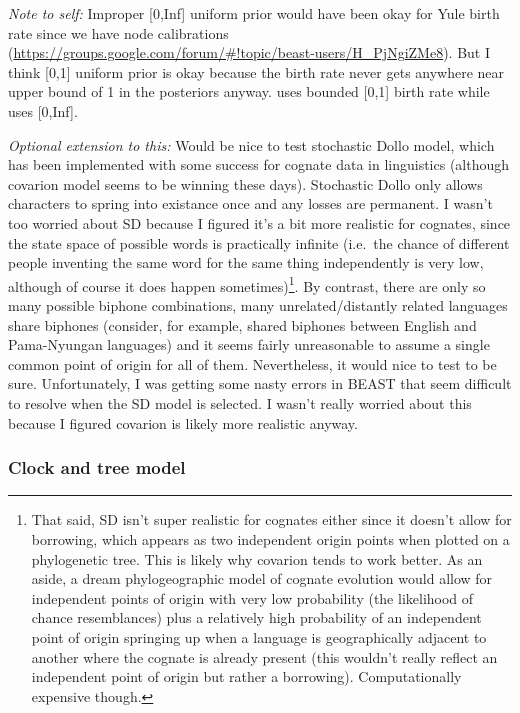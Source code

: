 \documentclass[]{article}
\begin{document}
\emph{Note to self:} Improper {[}0,Inf{]} uniform prior would have been okay for Yule birth rate since we have node calibrations (\url{https://groups.google.com/forum/\#!topic/beast-users/H_PjNgiZMe8}). But I think {[}0,1{]} uniform prior is okay because the birth rate never gets anywhere near upper bound of 1 in the posteriors anyway. \textcite{kolipakam_bayesian_2018} uses bounded {[}0,1{]} birth rate while \textcite{bouckaert_origin_2018} uses {[}0,Inf{]}.

\emph{Optional extension to this:} Would be nice to test stochastic Dollo model, which has been implemented with some success for cognate data in linguistics (although covarion model seems to be winning these days). Stochastic Dollo only allows characters to spring into existance once and any losses are permanent. I wasn't too worried about SD because I figured it's a bit more realistic for cognates, since the state space of possible words is practically infinite (i.e.~the chance of different people inventing the same word for the same thing independently is very low, although of course it does happen sometimes)\footnote{That said, SD isn't super realistic for cognates either since it doesn't allow for borrowing, which appears as two independent origin points when plotted on a phylogenetic tree. This is likely why covarion tends to work better. As an aside, a dream phylogeographic model of cognate evolution would allow for independent points of origin with very low probability (the likelihood of chance resemblances) plus a relatively high probability of an independent point of origin springing up when a language is geographically adjacent to another where the cognate is already present (this wouldn't really reflect an independent point of origin but rather a borrowing). Computationally expensive though.}. By contrast, there are only so many possible biphone combinations, many unrelated/distantly related languages share biphones (consider, for example, shared biphones between English and Pama-Nyungan languages) and it seems fairly unreasonable to assume a single common point of origin for all of them. Nevertheless, it would nice to test to be sure. Unfortunately, I was getting some nasty errors in BEAST that seem difficult to resolve when the SD model is selected. I wasn't really worried about this because I figured covarion is likely more realistic anyway.

\hypertarget{clock-and-tree-model}{%
\subsubsection{Clock and tree model}\label{clock-and-tree-model}}
\end{document}
